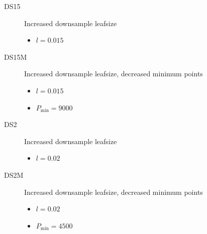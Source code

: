 \documentclass[11pt,a4paper]{kth-mag}
\begin{document}
\begin{description}
\begin{itemize}
  \end{itemize}
\item[DS15] Increased downsample leafsize
  \begin{itemize}
  \item $l=0.015$
  \end{itemize}
\item[DS15M] Increased downsample leafsize, decreased minimum points
  \begin{itemize}
  \item $l=0.015$
  \item $P_{\min}=9000$
  \end{itemize}
\item[DS2] Increased downsample leafsize
  \begin{itemize}
  \item $l=0.02$
  \end{itemize}
\item[DS2M] Increased downsample leafsize, decreased minimum points
  \begin{itemize}
  \item $l=0.02$
  \item $P_{\min}=4500$
  \end{itemize}
\end{description}
\end{document}
